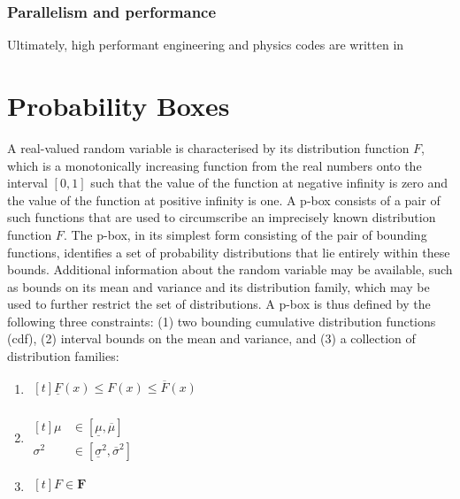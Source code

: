 \documentclass{juliacon}
\begin{document}
\subsubsection{Parallelism and performance} \hfill \break

Ultimately, high performant engineering and physics codes are written in 

\fi
\section{Probability Boxes}
\label{sec:pboxes}
A real-valued random variable is characterised by its distribution function $F$, which is a monotonically increasing function from the real numbers onto the interval $[0, 1]$ such that the value of the function at negative infinity is zero and the value of the function at positive infinity is one.  A p-box consists of a pair of such functions that are used to circumscribe an imprecisely known distribution function $F$. The p-box, in its simplest form consisting of the pair of bounding functions, identifies a set of probability distributions that lie entirely within these bounds. Additional information about the random variable may be available, such as bounds on its mean and variance and its distribution family, which may be used to further restrict the set of distributions. A p-box is thus defined by the following three constraints: (1) two bounding cumulative distribution functions (cdf), (2) interval bounds on the mean and variance, and (3) a collection of distribution families:
\begin{enumerate}
  \item $\begin{aligned}[t]
    \underline{F}(x) \leq F(x) \leq \overline{F}(x) \\%
  \end{aligned}$
  \item $\begin{aligned}[t]
    \mu &\in [\underline{ \mu }, \overline{ \mu }]  \\%
    \sigma^2 &\in [\underline{\sigma}^2 , \overline{\sigma}^2]
  \end{aligned}$
  \item $\begin{aligned}[t]
      F \in \bm{F} \\%
  \end{aligned}$
  \end{enumerate}
\end{document}
